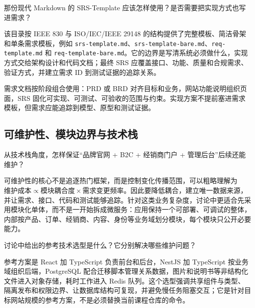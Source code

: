 \documentclass[UTF8,a4paper,11pt]{ctexart}
\begin{document}
\begin{membermsg}
那份现代 Markdown 的 SRS-Template 应该怎样使用？是否需要把实现方式也写进需求？
\end{membermsg}

\begin{gptmsg}
该目录按 IEEE 830 与 ISO/IEC/IEEE 29148 的结构提供了完整模板、简洁骨架和单条需求模板，例如 \texttt{srs-template.md}、\texttt{srs-template-bare.md}、\texttt{req-template.md} 和 \texttt{req-template-bare.md}。它的边界是写清系统必须做什么，实现方式交给架构设计和代码文档；最终 SRS 应覆盖接口、功能、质量和合规需求、验证方式，并建立需求 ID 到测试证据的追踪关系。
\end{gptmsg}

\begin{decisionbox}
需求文档按阶段组合使用：PRD 或 BRD 对齐目标和业务，网站功能说明组织页面，SRS 固化可实现、可测试、可验收的范围与约束。实现方案不提前塞进需求模板，但需求应能追踪到模型、原型和测试证据。
\end{decisionbox}

\subsection{可维护性、模块边界与技术栈}

\begin{membermsg}
从技术栈角度，怎样保证“品牌官网 + B2C + 经销商门户 + 管理后台”后续还能维护？
\end{membermsg}

\begin{gptmsg}
可维护性的核心不是追逐热门框架，而是控制变化传播范围，可以粗略理解为 $\text{维护成本}\propto\text{模块耦合度}\times\text{需求变更频率}$。因此要降低耦合，建立唯一数据来源，并让需求、接口、代码和测试能够追踪。针对这类业务复杂度，讨论中更适合先采用模块化单体，而不是一开始拆成微服务：应用保持一个可部署、可调试的整体，内部按产品、订单、经销商、内容、身份等业务域划分模块，每个模块只公开必要能力。
\end{gptmsg}

\begin{membermsg}
讨论中给出的参考技术选型是什么？它分别解决哪些维护问题？
\end{membermsg}

\begin{gptmsg}
参考方案是 React 加 TypeScript 负责前台和后台，NestJS 加 TypeScript 按业务域组织后端，PostgreSQL 配合迁移脚本管理关系数据，图片和说明书等非结构化文件进入对象存储，耗时工作进入 Redis 队列。这个选型强调共享组件与类型、隔离发布和权限边界、让数据库结构可复现，并避免慢任务阻塞交互；它是针对目标网站规模的参考方案，不是必须替换当前课程仓库的命令。
\end{gptmsg}
\end{document}
